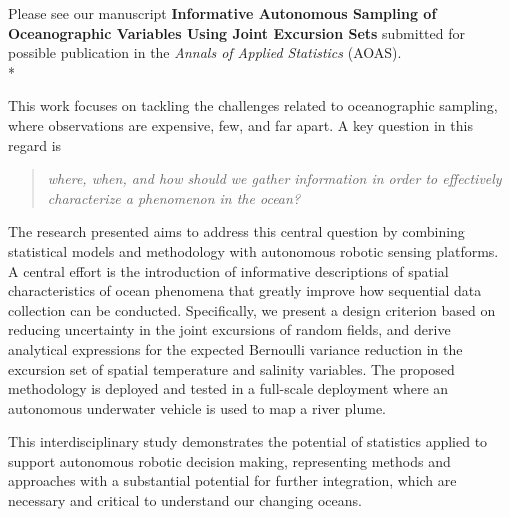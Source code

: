 \documentclass[10pt,stdletter]{newlfm}
\begin{document}
\begin{newlfm}

Please see our manuscript \textbf{Informative Autonomous Sampling of Oceanographic Variables Using Joint Excursion Sets} submitted for possible publication in the \emph{Annals of Applied Statistics} (AOAS).\\*

This work focuses on tackling the challenges related to oceanographic sampling, where observations are expensive, few, and far apart. A key question in this regard is 

\begin{quote}
\textit{where, when, and how should we gather information in order to effectively characterize a phenomenon in the ocean?}  
\end{quote}{}

The research presented aims to address this central question by combining statistical models and methodology with autonomous robotic sensing platforms. A central effort is the introduction of informative descriptions of spatial characteristics of ocean phenomena that greatly improve how sequential data collection can be conducted. Specifically, we present a design criterion based on reducing uncertainty in the joint excursions of random fields, and derive analytical expressions for the expected Bernoulli variance reduction in the excursion set of spatial temperature and salinity variables. The proposed methodology is deployed and tested in a full-scale deployment where an autonomous underwater vehicle is used to map a river plume. 

This interdisciplinary study demonstrates the potential of statistics applied to support autonomous robotic decision making, representing methods and approaches with a substantial potential for further integration, which are necessary and critical to understand our changing oceans. 
\vspace{1em}


\end{newlfm}
\end{document}
